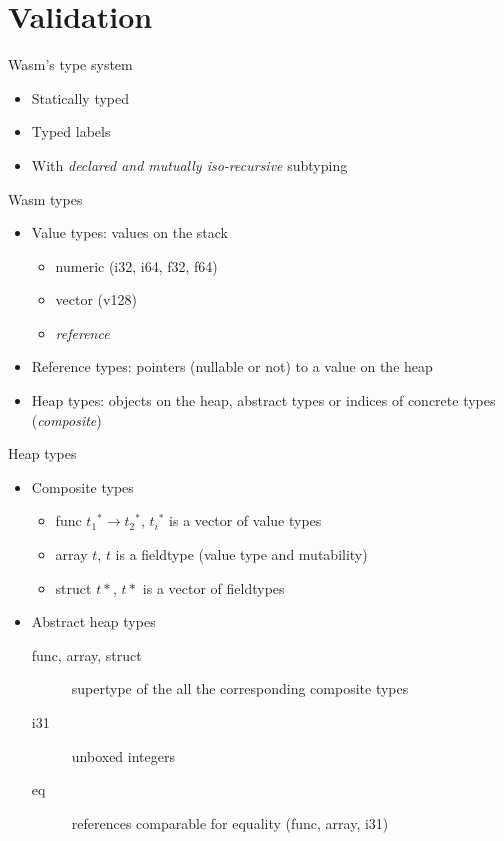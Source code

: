 \documentclass{beamer}
\begin{document}
\section{Validation}
\begin{frame}{Wasm's type system}
  \begin{itemize}
    \item Statically typed
    \item Typed labels
    \item With \emph{declared and mutually iso-recursive} subtyping
  \end{itemize}
\end{frame}
\begin{frame}{Wasm types}
  \begin{itemize}
    \item Value types: values on the stack\pause
      \begin{itemize}
        \item numeric (i32, i64, f32, f64)
        \item vector (v128)
        \item \emph{reference}
      \end{itemize}\pause
    \item Reference types: pointers (nullable or not) to a value on the heap
      \pause
    \item Heap types: objects on the heap, abstract types or indices of concrete
      types (\emph{composite})
  \end{itemize}
\end{frame}
\begin{frame}{Heap types}
  \begin{itemize}
    \item Composite types
      \begin{itemize}
        \item \textsf{func} ${t_1}^*\to {t_2}^*$, ${t_i}^*$ is a
          vector of value types\pause
        \item \textsf{array} $t$, $t$ is a fieldtype (value type and
          mutability)\pause
        \item \textsf{struct} $t*$, $t*$ is a vector of fieldtypes
      \end{itemize}
    \item Abstract heap types
      \begin{description}
        \item[func, array, struct] supertype of the all the corresponding
          composite types
        \item[i31] unboxed integers
        \item[eq] references comparable for equality (func, array, i31)
      \end{description}
  \end{itemize}
\end{frame}
\end{document}
